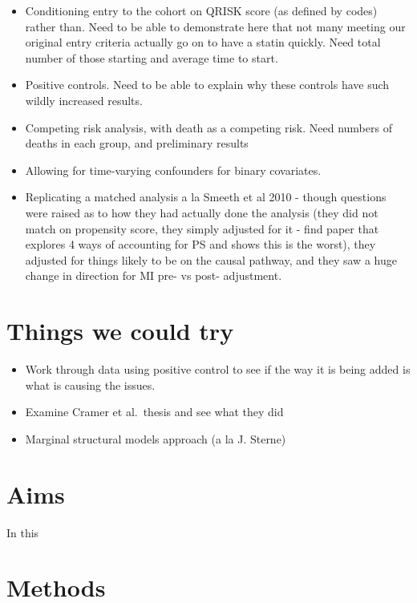 \documentclass[a4paper, twoside]{templates/ociamthesis}
\providecommand{\tightlist}{%
  \setlength{\itemsep}{0pt}\setlength{\parskip}{0pt}}
\begin{document}
\begin{itemize}
\tightlist
\item
  Conditioning entry to the cohort on QRISK score (as defined by codes) rather than. Need to be able to demonstrate here that not many meeting our original entry criteria actually go on to have a statin quickly. Need total number of those starting and average time to start.
\item
  Positive controls. Need to be able to explain why these controls have such wildly increased results.
\item
  Competing risk analysis, with death as a competing risk. Need numbers of deaths in each group, and preliminary results
\item
  Allowing for time-varying confounders for binary covariates.
\item
  Replicating a matched analysis a la Smeeth et al 2010 - though questions were raised as to how they had actually done the analysis (they did not match on propensity score, they simply adjusted for it - find paper that explores 4 ways of accounting for PS and shows this is the worst), they adjusted for things likely to be on the causal pathway, and they saw a huge change in direction for MI pre- vs post- adjustment.
\end{itemize}

\hypertarget{things-we-could-try}{%
\section{Things we could try}\label{things-we-could-try}}

\begin{itemize}
\tightlist
\item
  Work through data using positive control to see if the way it is being added is what is causing the issues.
\item
  Examine Cramer et al.~thesis and see what they did
\item
  Marginal structural models approach (a la J. Sterne)
\end{itemize}

\hypertarget{aims-1}{%
\section{Aims}\label{aims-1}}

In this

\hypertarget{methods-1}{%
\section{Methods}\label{methods-1}}
\end{document}
